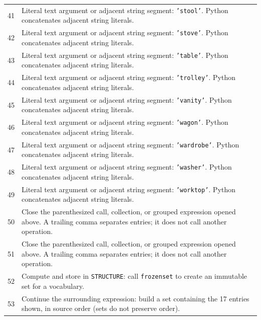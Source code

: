 \documentclass[11pt,a4paper]{book}
\begin{document}
\begin{longtable}{r p{}}
41 & Literal text argument or adjacent string segment: \texttt{'stool'}. Python concatenates adjacent string literals. \\

42 & Literal text argument or adjacent string segment: \texttt{'stove'}. Python concatenates adjacent string literals. \\

43 & Literal text argument or adjacent string segment: \texttt{'table'}. Python concatenates adjacent string literals. \\

44 & Literal text argument or adjacent string segment: \texttt{'trolley'}. Python concatenates adjacent string literals. \\

45 & Literal text argument or adjacent string segment: \texttt{'vanity'}. Python concatenates adjacent string literals. \\

46 & Literal text argument or adjacent string segment: \texttt{'wagon'}. Python concatenates adjacent string literals. \\

47 & Literal text argument or adjacent string segment: \texttt{'wardrobe'}. Python concatenates adjacent string literals. \\

48 & Literal text argument or adjacent string segment: \texttt{'washer'}. Python concatenates adjacent string literals. \\

49 & Literal text argument or adjacent string segment: \texttt{'worktop'}. Python concatenates adjacent string literals. \\

50 & Close the parenthesized call, collection, or grouped expression opened above. A trailing comma separates entries; it does not call another operation. \\

51 & Close the parenthesized call, collection, or grouped expression opened above. A trailing comma separates entries; it does not call another operation. \\

52 & Compute and store in \texttt{STRUCTURE}: call \texttt{frozenset} to create an immutable set for a vocabulary.  \\

53 & Continue the surrounding expression: build a set containing the 17 entries shown, in source order (sets do not preserve order). \\


\end{longtable}
\end{document}
